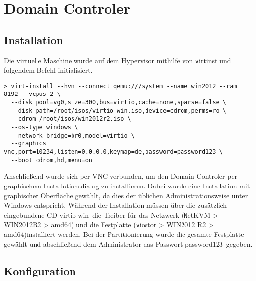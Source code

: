 \section{Domain Controler}

\subsection{Installation}

Die virtuelle Maschine wurde auf dem Hypervisor mithilfe von {\texttt virtinst} und folgendem Befehl initialisiert.

\begin{lstlisting}[numbers=none]
> virt-install --hvm --connect qemu:///system --name win2012 --ram 8192 --vcpus 2 \
  --disk pool=vg0,size=300,bus=virtio,cache=none,sparse=false \
  --disk path=/root/isos/virtio-win.iso,device=cdrom,perms=ro \
  --cdrom /root/isos/win2012r2.iso \
  --os-type windows \
  --network bridge=br0,model=virtio \
  --graphics vnc,port=10234,listen=0.0.0.0,keymap=de,password=password123 \
  --boot cdrom,hd,menu=on
\end{lstlisting}

Anschließend wurde sich per VNC verbunden, um den Domain Controler per graphischem Installationsdialog zu installieren. Dabei wurde eine Installation mit graphischer Oberfläche gewählt, da dies der üblichen Administrationsweise unter Windows entspricht. Während der Installation müssen über die zusätzlich eingebundene CD \ql virtio-win\qr\ die Treiber für das Netzwerk ({\texttt NetKVM > WIN2012R2 > amd64}) und die Festplatte ({\texttt viostor > WIN2012	R2 > amd64})installiert werden. Bei der Partitionierung wurde die gesamte Festplatte gewählt und abschließend dem Administrator das Passwort \ql password123\qr\ gegeben.

\subsection{Konfiguration}